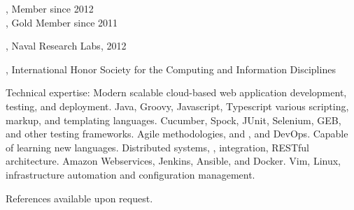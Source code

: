 \documentclass[10pt,a4paper]{article}
\begin{document}
\vspace{0.5em}
\spacedhrule{0.5em}{-0.4em}



\noindent{}, Member since 2012 \\
\noindent{}, Gold Member since 2011 \\
\vspace{0.5em}
\spacedhrule{0.5em}{-0.4em}


, Naval Research Labs, 2012

\noindent{}, International Honor Society for the Computing and Information Disciplines
\vspace{0.5em}
\spacedhrule{0.5em}{-0.4em}


\inlineheadsection  %
  {Technical expertise:}
  {
    Modern scalable cloud-based web application development, testing, and deployment.
    Java, Groovy, Javascript, Typescript various scripting, markup, and templating languages.
    Cucumber, Spock, JUnit, Selenium, GEB, and other testing frameworks.
    Agile methodologies,  and , and DevOps.
    Capable of learning new languages.
    Distributed systems, , integration, RESTful architecture.
    Amazon Webservices, Jenkins, Ansible, and Docker.
    Vim, Linux, infrastructure automation and configuration management.
  }

\spacedhrule{1.6em}{-0.4em}

\vspace{1.0em}

\noindent References available upon request.
\end{document}

